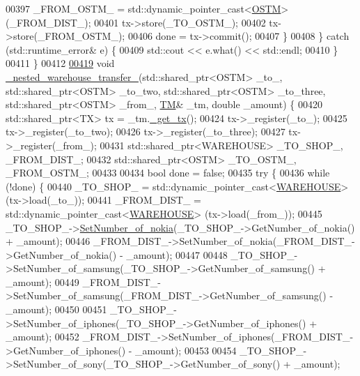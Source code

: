 \begin{DoxyCode}
00397             \_FROM\_OSTM\_ = std::dynamic\_pointer\_cast<\hyperlink{class_o_s_t_m}{OSTM}> (\_FROM\_DIST\_);
00401             tx->store(\_TO\_OSTM\_);
00402             tx->store(\_FROM\_OSTM\_);
00406             done = tx->commit();
00407         \}
00408     \} \textcolor{keywordflow}{catch} (std::runtime\_error& e) \{
00409         std::cout << e.what() << std::endl;
00410     \}
00411 \}
00412 
\hypertarget{main_8cpp_source.tex_l00419}{}\hyperlink{main_8cpp_a52fcb0d50c67be8cd20f2aca338683c7_a52fcb0d50c67be8cd20f2aca338683c7}{00419} \textcolor{keywordtype}{void} \hyperlink{main_8cpp_a52fcb0d50c67be8cd20f2aca338683c7_a52fcb0d50c67be8cd20f2aca338683c7}{\_nested\_warehouse\_transfer\_}(std::shared\_ptr<OSTM> \_to\_, 
      std::shared\_ptr<OSTM> \_to\_two, std::shared\_ptr<OSTM> \_to\_three, std::shared\_ptr<OSTM> \_from\_, \hyperlink{class_t_m}{TM}& \_tm, \textcolor{keywordtype}{double} \_amount) \{
00420     std::shared\_ptr<TX> tx = \_tm.\hyperlink{class_t_m_a41cb0226cc4080c931651b13f74a0075_a41cb0226cc4080c931651b13f74a0075}{\_get\_tx}();
00424     tx->\_register(\_to\_);
00425     tx->\_register(\_to\_two);
00426     tx->\_register(\_to\_three);
00427     tx->\_register(\_from\_);
00431     std::shared\_ptr<WAREHOUSE> \_TO\_SHOP\_, \_FROM\_DIST\_;
00432     std::shared\_ptr<OSTM> \_TO\_OSTM\_, \_FROM\_OSTM\_;
00433 
00434     \textcolor{keywordtype}{bool} done = \textcolor{keyword}{false};
00435     \textcolor{keywordflow}{try} \{
00436         \textcolor{keywordflow}{while} (!done) \{
00440             \_TO\_SHOP\_ = std::dynamic\_pointer\_cast<\hyperlink{class_w_a_r_e_h_o_u_s_e}{WAREHOUSE}> (tx->load(\_to\_));
00441             \_FROM\_DIST\_ = std::dynamic\_pointer\_cast<\hyperlink{class_w_a_r_e_h_o_u_s_e}{WAREHOUSE}> (tx->load(\_from\_));
00445             \_TO\_SHOP\_->\hyperlink{class_w_a_r_e_h_o_u_s_e_a300d1fe21a47e45c0d5d27e25add346f_a300d1fe21a47e45c0d5d27e25add346f}{SetNumber\_of\_nokia}(\_TO\_SHOP\_->GetNumber\_of\_nokia() + \_amount);
00446             \_FROM\_DIST\_->SetNumber\_of\_nokia(\_FROM\_DIST\_->GetNumber\_of\_nokia() - \_amount);
00447 
00448             \_TO\_SHOP\_->SetNumber\_of\_samsung(\_TO\_SHOP\_->GetNumber\_of\_samsung() + \_amount);
00449             \_FROM\_DIST\_->SetNumber\_of\_samsung(\_FROM\_DIST\_->GetNumber\_of\_samsung() - \_amount);
00450 
00451             \_TO\_SHOP\_->SetNumber\_of\_iphones(\_TO\_SHOP\_->GetNumber\_of\_iphones() + \_amount);
00452             \_FROM\_DIST\_->SetNumber\_of\_iphones(\_FROM\_DIST\_->GetNumber\_of\_iphones() - \_amount);
00453 
00454             \_TO\_SHOP\_->SetNumber\_of\_sony(\_TO\_SHOP\_->GetNumber\_of\_sony() + \_amount);

\end{DoxyCode}
